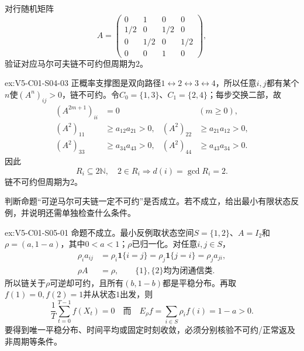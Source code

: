 \begin{SLChapterExercisePairSection}
\begin{exercise}\label{ex:V5-C01-S04-03}
对行随机矩阵
\[
A=\begin{pmatrix}
0&1&0&0\\
1/2&0&1/2&0\\
0&1/2&0&1/2\\
0&0&1&0
\end{pmatrix},
\]
验证对应马尔可夫链不可约但周期为$2$。
\end{exercise}
\ifSLFullEdition
{}\label{sol:V5-C01-S04-03}
\begin{chapterexercisesolution}{ex:V5-C01-S04-03}
正概率支撑图是双向路径$1\leftrightarrow2\leftrightarrow3\leftrightarrow4$，所以任意$i,j$都有某个$n$使$(A^n)_{ij}>0$，链不可约。令$C_0=\{1,3\}$、$C_1=\{2,4\}$；每步交换二部，故
\[
\begin{aligned}
(A^{2m+1})_{ii}&=0 &&(m\ge0),\\
(A^2)_{11}&\ge a_{12}a_{21}>0,&
(A^2)_{22}&\ge a_{21}a_{12}>0,\\
(A^2)_{33}&\ge a_{34}a_{43}>0,&
(A^2)_{44}&\ge a_{43}a_{34}>0.
\end{aligned}
\]
因此
\[
R_i\subseteq2\mathbb N,\quad 2\in R_i
\Longrightarrow d(i)=\gcd R_i=2.
\]
链不可约但周期为$2$。
\end{chapterexercisesolution}
\fi

\begin{exercise}\label{ex:V5-C01-S05-01}
判断命题“可逆马尔可夫链一定不可约”是否成立。若不成立，给出最小有限状态反例，并说明还需单独检查什么条件。
\end{exercise}
\ifSLFullEdition
{}\label{sol:V5-C01-S05-01}
\begin{chapterexercisesolution}{ex:V5-C01-S05-01}
命题不成立。最小反例取状态空间$S=\{1,2\}$、$A=I_2$和$\rho=(a,1-a)$，其中$0<a<1$；$\rho$已归一化。对任意$i,j\in S$，
\[
\begin{aligned}
\rho_i a_{ij}&=\rho_i\boldsymbol1\{i=j\}
=\rho_j\boldsymbol1\{j=i\}=\rho_j a_{ji},\\
\rho A&=\rho,\qquad
\{1\},\{2\}\text{均为闭通信类}.
\end{aligned}
\]
所以链关于$\rho$可逆却可约，且所有$(b,1-b)$都是平稳分布。再取$f(1)=0,f(2)=1$并从状态$1$出发，则
\[
\frac1T\sum_{t=0}^{T-1}f(X_t)=0
\quad\text{而}\quad
E_\rho f=\sum_{i\in S}\rho_i f(i)=1-a>0.
\]
要得到唯一平稳分布、时间平均或固定时刻收敛，必须分别核验不可约/正常返及非周期等条件。
\end{chapterexercisesolution}
\fi


\end{SLChapterExercisePairSection}
